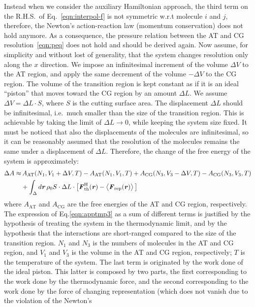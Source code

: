 \documentclass[a4paper,preprint,unsortedaddress]{revtex4-1}
\newcommand{\recheck}[1]{{\color{red} #1}}
\newcommand{\vect}[1]{\textbf{\textit{#1}}}
\newcommand{\AT}{{\textrm{{AT}}}}
\newcommand{\CG}{{\textrm{CG}}}
\newcommand{\thf}{{\textrm{th}}}
\newcommand{\res}{{\textrm{rep}}}
\newcommand{\hadress}{{\textrm{H}}}
\begin{document}
{Instead when we consider the auxiliary Hamiltonian approach, the third term on the R.H.S.~of Eq.~\eqref{eqn:interpol-f} is not
symmetric w.r.t molecule $i$ and $j$, therefore, the Newton's
action-reaction law (momentum conservation) does not hold anymore.
As a consequence, the pressure relation between the AT and CG
resolution~\eqref{eqn:peq} does not hold and should be derived again.
Now assume, \recheck{for simplicity and without lost of generality}, that the system changes resolution only along the $x$ direction.
We impose an infinitesimal increment of the volume $\Delta V$ to the
AT region, and apply the same decrement of the volume $-\Delta V$ to the CG
region.  The volume of the transition region is kept constant as if it is an ideal ``piston'' that moves toward the CG region by an amount $\Delta L$.
We assume $\Delta V = \Delta L\cdot S$, where $S$ is the
cutting surface area.
The displacement $\Delta L$ should be infinitesimal, i.e.~much smaller than the size of the
transition region. This is achievable by taking the limit of $\Delta L\rightarrow 0$,
while keeping the system size fixed.
It must be noticed that also the displacements of the molecules are infinitesimal, so it can be reasonably assumed that
the resolution of the molecules remains the same under a displacement of $\Delta L$.
Therefore, the change of the free energy of the system is approximately:
\begin{align}\nonumber
  \Delta A \approx&\,
  A_\AT(N_1, V_1+\Delta V, T) -
  A_\AT(N_1, V_1, T)
  +
  A_\CG(N_3, V_3-\Delta V, T) -
  A_\CG(N_3, V_3, T)\\\label{eqn:apptmp3}
  &+
  \int_\Delta d \vect r\, \rho_0 S\cdot \Delta L\cdot
  \big[\vect F^\hadress_\thf(\vect r)
  -
  \big\langle \vect F_\res(\vect r)\big\rangle\,\big]
\end{align}
where $A_\AT$ and $A_\CG$ are the free energies of the AT and CG region, respectively.
The expression of Eq.\ref{eqn:apptmp3} as a sum of different terms is justified by the hypothesis of treating the system in the thermodynamic limit, and by the hypothesis that the interactions are short-ranged compared to the size of the transition region.
$N_1$ and $N_3$ is the numbers of molecules in the AT and CG region, and
$V_1$ and $V_3$ is the volume in the AT and CG region, respectively; $T$ is the temperature
of the system.
The last term is originated by the work done of the ideal piston. This latter is composed by
two parts, the first corresponding to the work done by the thermodynamic force, and the
second corresponding to 
the work done by the force of changing representation (which does not vanish due to the violation of the Newton's
}
\end{document}
